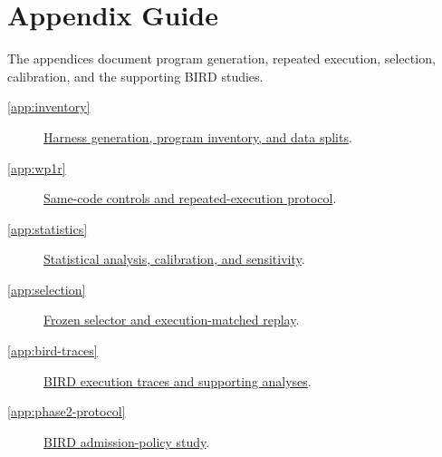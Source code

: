 \FloatBarrier
{}
\section*{Appendix Guide}
The appendices document program generation, repeated execution, selection,
calibration, and the supporting BIRD studies.
\begin{description}
\item[\ref{app:inventory}] \hyperref[app:inventory]{Harness generation, program inventory, and data splits}.
\item[\ref{app:wp1r}] \hyperref[app:wp1r]{Same-code controls and repeated-execution protocol}.
\item[\ref{app:statistics}] \hyperref[app:statistics]{Statistical analysis, calibration, and sensitivity}.
\item[\ref{app:selection}] \hyperref[app:selection]{Frozen selector and execution-matched replay}.
\item[\ref{app:bird-traces}] \hyperref[app:bird-traces]{BIRD execution traces and supporting analyses}.
\item[\ref{app:phase2-protocol}] \hyperref[app:phase2-protocol]{BIRD admission-policy study}.
\end{description}
\FloatBarrier

\FloatBarrier

\FloatBarrier

\FloatBarrier

\FloatBarrier

\FloatBarrier

\FloatBarrier

